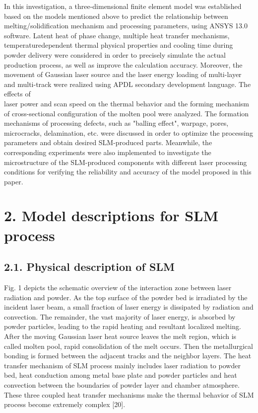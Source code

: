 \documentclass[10pt]{article}
\begin{document}
In this investigation, a three-dimensional finite element model was established based on the models mentioned above to predict the relationship between melting/solidification mechanism and processing parameters, using ANSYS 13.0 software. Latent heat of phase change, multiple heat transfer mechanisms, temperaturedependent thermal physical properties and cooling time during powder delivery were considered in order to precisely simulate the actual production process, as well as improve the calculation accuracy. Moreover, the movement of Gaussian laser source and the laser energy loading of multi-layer and multi-track were realized using APDL secondary development language. The effects of\\
laser power and scan speed on the thermal behavior and the forming mechanism of cross-sectional configuration of the molten pool were analyzed. The formation mechanisms of processing defects, such as "balling effect", warpage, pores, microcracks, delamination, etc. were discussed in order to optimize the processing parameters and obtain desired SLM-produced parts. Meanwhile, the corresponding experiments were also implemented to investigate the microstructure of the SLM-produced components with different laser processing conditions for verifying the reliability and accuracy of the model proposed in this paper.

\section*{2. Model descriptions for SLM process}
\subsection*{2.1. Physical description of SLM}
Fig. 1 depicts the schematic overview of the interaction zone between laser radiation and powder. As the top surface of the powder bed is irradiated by the incident laser beam, a small fraction of laser energy is dissipated by radiation and convection. The remainder, the vast majority of laser energy, is absorbed by powder particles, leading to the rapid heating and resultant localized melting. After the moving Gaussian laser heat source leaves the melt region, which is called molten pool, rapid consolidation of the melt occurs. Then the metallurgical bonding is formed between the adjacent tracks and the neighbor layers. The heat transfer mechanism of SLM process mainly includes laser radiation to powder bed, heat conduction among metal base plate and powder particles and heat convection between the boundaries of powder layer and chamber atmosphere. These three coupled heat transfer mechanisms make the thermal behavior of SLM process become extremely complex [20].
\end{document}
